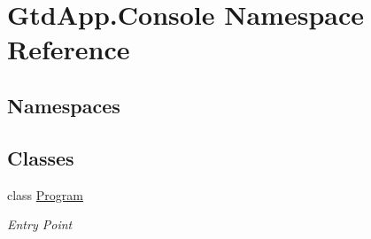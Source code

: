 \hypertarget{namespace_gtd_app_1_1_console}{}\section{Gtd\+App.\+Console Namespace Reference}
\label{namespace_gtd_app_1_1_console}
\subsection*{Namespaces}
\begin{DoxyCompactItemize}
\end{DoxyCompactItemize}
\subsection*{Classes}
\begin{DoxyCompactItemize}
\item 
class \mbox{\hyperlink{class_gtd_app_1_1_console_1_1_program}{Program}}
\begin{DoxyCompactList}\small\item\em Entry Point \end{DoxyCompactList}\end{DoxyCompactItemize}
